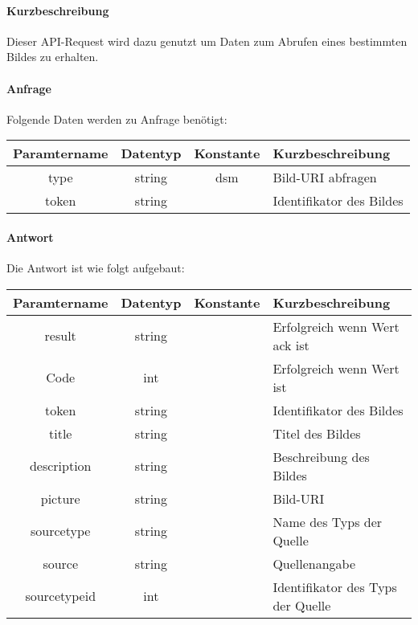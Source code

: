 \paragraph{Kurzbeschreibung}Dieser API-Request wird dazu genutzt um Daten zum Abrufen eines bestimmten Bildes zu erhalten.
\paragraph{Anfrage}Folgende Daten werden zu Anfrage benötigt:
\begin{table}[H]
	\begin{tabular}{|c|c|c|p{6.5cm}|}
		\hline
		\textbf{Paramtername} & \textbf{Datentyp} & \textbf{Konstante} & \textbf{Kurzbeschreibung}                                                                                               \\ \hline
		type                & string            & dsm                & Bild-URI abfragen \\ \hline
		token               & string            &                    & Identifikator des Bildes \\ \hline
	\end{tabular}
\end{table}
\paragraph{Antwort}Die Antwort ist wie folgt aufgebaut:
\begin{table}[H]
	\begin{tabular}{|c|c|c|p{6.5cm}|}
		\hline
		\textbf{Paramtername} & \textbf{Datentyp} & \textbf{Konstante} & \textbf{Kurzbeschreibung}                                                                                               \\ \hline
		result              & string           &                 & Erfolgreich wenn Wert {\glqq ack\grqq} ist \\ \hline
		Code                & int              &                 & Erfolgreich wenn Wert {\glqq 0\grqq} ist \\ \hline
		token               & string           &                 & Identifikator des Bildes \\ \hline
		title               & string           &                 & Titel des Bildes \\ \hline
		description         & string           &                 & Beschreibung des Bildes \\ \hline
		picture             & string           &                 & Bild-URI \\ \hline
		sourcetype          & string           &                 & Name des Typs der Quelle \\ \hline
		source              & string           &                 & Quellenangabe \\ \hline
		sourcetypeid        & int              &                 & Identifikator des Typs der Quelle \\ \hline
	\end{tabular}
\end{table}
